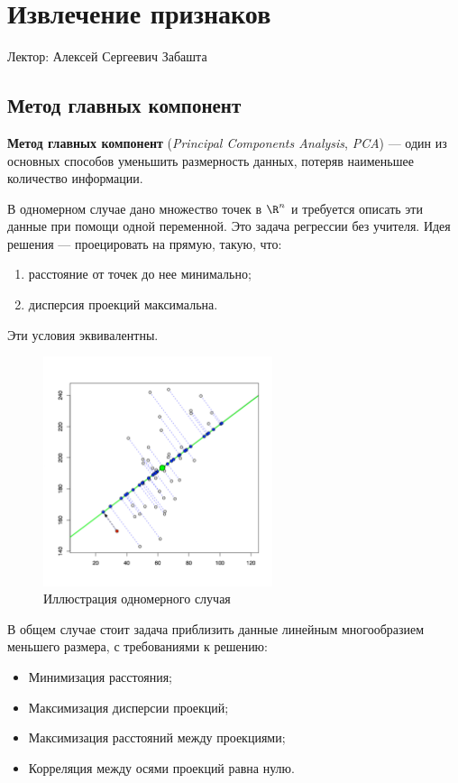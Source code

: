 \chapter{Извлечение признаков}

Лектор: Алексей Сергеевич Забашта

\section{Метод главных компонент}

\begin{definition}
    \textbf{Метод главных компонент} (\textit{Principal Components Analysis}, \textit{PCA}) — один из основных способов уменьшить размерность данных, потеряв наименьшее количество информации.
\end{definition}

В одномерном случае дано множество точек в $\R^n$ и требуется описать эти данные при помощи одной переменной. Это задача регрессии без учителя. Идея решения ---  проецировать на прямую, такую, что:
\begin{enumerate}
    \item расстояние от точек до нее минимально;
    \item дисперсия проекций максимальна.
\end{enumerate}
\begin{remark}
    Эти условия эквивалентны.
\end{remark}

\begin{figure}
    \centering
    \includegraphics[width=0.6\textwidth]{images/pca-example.jpg}
    \caption{Иллюстрация одномерного случая}
\end{figure}

В общем случае стоит задача приблизить данные линейным многообразием меньшего размера, с требованиями к решению:
\begin{itemize}
    \item Минимизация расстояния;
    \item Максимизация дисперсии проекций;
    \item Максимизация расстояний между проекциями;
    \item Корреляция между осями проекций равна нулю.
\end{itemize}

